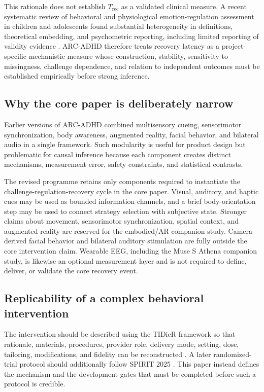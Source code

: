 This rationale does not establish \(T_{\mathrm{rec}}\) as a validated clinical measure. A recent systematic review of behavioral and physiological emotion-regulation assessment in children and adolescents found substantial heterogeneity in definitions, theoretical embedding, and psychometric reporting, including limited reporting of validity evidence \parencite{bunz2026ermeasurement}. ARC-ADHD therefore treats recovery latency as a project-specific mechanistic measure whose construction, stability, sensitivity to missingness, challenge dependence, and relation to independent outcomes must be established empirically before strong inference.

\subsection{Why the core paper is deliberately narrow}

Earlier versions of ARC-ADHD combined multisensory cueing, sensorimotor synchronization, body awareness, augmented reality, facial behavior, and bilateral audio in a single framework. Such modularity is useful for product design but problematic for causal inference because each component creates distinct mechanisms, measurement error, safety constraints, and statistical contrasts.

The revised programme retains only components required to instantiate the challenge-regulation-recovery cycle in the core paper. Visual, auditory, and haptic cues may be used as bounded information channels, and a brief body-orientation step may be used to connect strategy selection with subjective state. Stronger claims about movement, sensorimotor synchronization, spatial context, and augmented reality are reserved for the embodied/AR companion study. Camera-derived facial behavior and bilateral auditory stimulation are fully outside the core intervention claim. Wearable EEG, including the Muse S Athena companion study, is likewise an optional measurement layer and is not required to define, deliver, or validate the core recovery event.

\subsection{Replicability of a complex behavioral intervention}

The intervention should be described using the TIDieR framework so that rationale, materials, procedures, provider role, delivery mode, setting, dose, tailoring, modifications, and fidelity can be reconstructed \parencite{hoffmann2014tidier}. A later randomized-trial protocol should additionally follow SPIRIT 2025 \parencite{chan2025spirit}. This paper instead defines the mechanism and the development gates that must be completed before such a protocol is credible.
